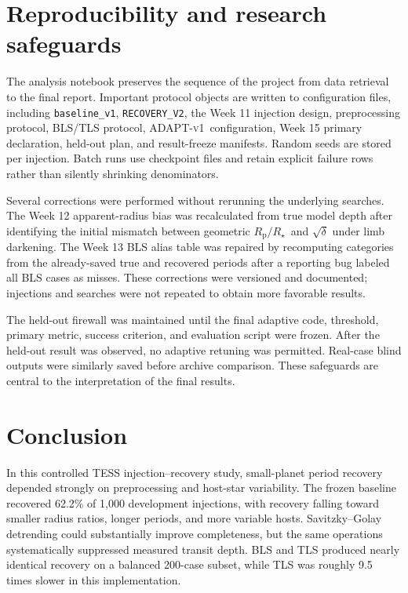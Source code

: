 \documentclass[11pt]{article}
\newcommand{\rprs}{$R_{\mathrm p}/R_\star$}
\newcommand{\adapt}{\textsc{ADAPT-v1}}
\begin{document}
\section{Reproducibility and research safeguards}
The analysis notebook preserves the sequence of the project from data retrieval to the final report. Important protocol objects are written to configuration files, including \texttt{baseline\_v1}, \texttt{RECOVERY\_V2}, the Week 11 injection design, preprocessing protocol, BLS/TLS protocol, \adapt\ configuration, Week 15 primary declaration, held-out plan, and result-freeze manifests. Random seeds are stored per injection. Batch runs use checkpoint files and retain explicit failure rows rather than silently shrinking denominators.

Several corrections were performed without rerunning the underlying searches. The Week 12 apparent-radius bias was recalculated from true model depth after identifying the initial mismatch between geometric \rprs\ and $\sqrt{\delta}$ under limb darkening. The Week 13 BLS alias table was repaired by recomputing categories from the already-saved true and recovered periods after a reporting bug labeled all BLS cases as misses. These corrections were versioned and documented; injections and searches were not repeated to obtain more favorable results.

The held-out firewall was maintained until the final adaptive code, threshold, primary metric, success criterion, and evaluation script were frozen. After the held-out result was observed, no adaptive retuning was permitted. Real-case blind outputs were similarly saved before archive comparison. These safeguards are central to the interpretation of the final results.

\section{Conclusion}
In this controlled TESS injection--recovery study, small-planet period recovery depended strongly on preprocessing and host-star variability. The frozen baseline recovered 62.2\% of 1,000 development injections, with recovery falling toward smaller radius ratios, longer periods, and more variable hosts. Savitzky--Golay detrending could substantially improve completeness, but the same operations systematically suppressed measured transit depth. BLS and TLS produced nearly identical recovery on a balanced 200-case subset, while TLS was roughly 9.5 times slower in this implementation.
\end{document}
